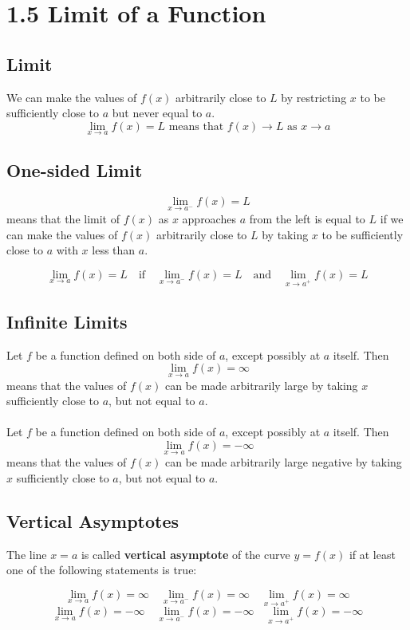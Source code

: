 %
%

\section*{1.5 Limit of a Function}

\subsection*{Limit}

We can make the values of \(f(x)\) arbitrarily close to \(L\) by restricting \(x\) to be sufficiently close to \(a\) but never equal to \(a\).
$$\lim_{x \to a}f(x)=L \text{ means that } f(x) \to L \text{ as } x \to a$$

\subsection*{One-sided Limit}

$$\lim_{x \to a^-}f(x)=L$$
means that the limit of \(f(x)\) as \(x\) approaches \(a\) from the left is equal to \(L\) if we can make the values of \(f(x)\) arbitrarily close to \(L\) by taking \(x\) to be sufficiently close to \(a\) with \(x\) less than \(a\).

$$\lim_{x \to a}f(x)=L \quad \text{if} \quad \lim_{x \to a^-}f(x)=L \quad \text{and} \quad \lim_{x \to a^+}f(x)=L$$

\subsection*{Infinite Limits}

Let \(f\) be a function defined on both side of \(a\), except possibly at \(a\) itself. Then 
$$\lim_{x \to a}f(x)=\infty$$
means that the values of \(f(x)\) can be made arbitrarily large by taking \(x\) sufficiently close to \(a\), but not equal to \(a\).
\\\\
Let \(f\) be a function defined on both side of \(a\), except possibly at \(a\) itself. Then 
$$\lim_{x \to a}f(x)=-\infty$$
means that the values of \(f(x)\) can be made arbitrarily large negative by taking \(x\) sufficiently close to \(a\), but not equal to \(a\).

\subsection*{Vertical Asymptotes}

The line \(x=a\) is called \textbf{vertical asymptote} of the curve \(y=f(x)\) if at least one of the following statements is true:

$$\lim_{x \to a}f(x)=\infty \quad \lim_{x \to a^-}f(x)=\infty \quad \lim_{x \to a^+}f(x)=\infty$$
$$\lim_{x \to a}f(x)=-\infty \quad \lim_{x \to a^-}f(x)=-\infty \quad \lim_{x \to a^+}f(x)=-\infty$$

